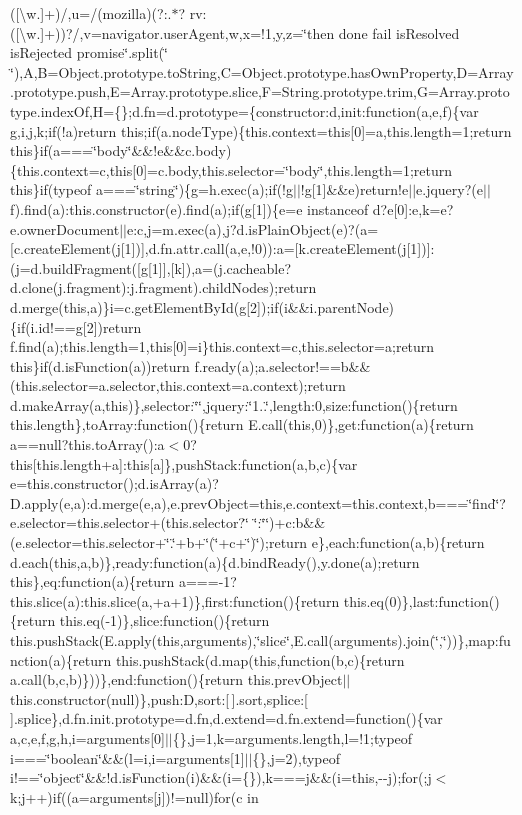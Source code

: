 ([\textbackslash{}w.]+)/,u=/(mozilla)(?\-:.$\ast$? rv\-:([\textbackslash{}w.]+))?/,v=navigator.\-user\-Agent,w,x=!1,y,z=\char`\"{}then done fail is\-Resolved is\-Rejected promise\char`\"{}.\-split(\char`\"{} \char`\"{}),\-A,\-B=\-Object.\-prototype.\-to\-String,\-C=\-Object.\-prototype.\-has\-Own\-Property,\-D=\-Array.\-prototype.\-push,\-E=\-Array.\-prototype.\-slice,\-F=\-String.\-prototype.\-trim,\-G=\-Array.\-prototype.\-index\-Of,\-H=\{\};d.\-fn=d.\-prototype=\{constructor\-:d,init\-:function(a,e,f)\{var g,i,j,k;if(!a)return this;if(a.\-node\-Type)\{this.\-context=this[0]=a,this.\-length=1;return this\}if(a===\char`\"{}body\char`\"{}\&\&!e\&\&c.\-body)\{this.\-context=c,this[0]=c.\-body,this.\-selector=\char`\"{}body\char`\"{},this.\-length=1;return this\}if(typeof a===\char`\"{}string\char`\"{})\{g=h.\-exec(a);if(!g$|$$|$!g[1]\&\&e)return!e$|$$|$e.\-jquery?(e$|$$|$f).\-find(a)\-:this.\-constructor(e).\-find(a);if(g[1])\{e=e instanceof d?e[0]\-:e,k=e?e.\-owner\-Document$|$$|$e\-:c,j=m.\-exec(a),j?d.\-is\-Plain\-Object(e)?(a=[c.\-create\-Element(j[1])],d.\-fn.\-attr.\-call(a,e,!0))\-:a=[k.\-create\-Element(j[1])]\-:(j=d.\-build\-Fragment([g[1]],[k]),a=(j.\-cacheable?d.\-clone(j.\-fragment)\-:j.\-fragment).\-child\-Nodes);return d.\-merge(this,a)\}i=c.\-get\-Element\-By\-Id(g[2]);if(i\&\&i.\-parent\-Node)\{if(i.\-id!==g[2])return f.\-find(a);this.\-length=1,this[0]=i\}this.\-context=c,this.\-selector=a;return this\}if(d.\-is\-Function(a))return f.\-ready(a);a.\-selector!==b\&\&(this.\-selector=a.\-selector,this.\-context=a.\-context);return d.\-make\-Array(a,this)\},selector\-:\char`\"{}\char`\"{},jquery\-:\char`\"{}1..\char`\"{},length\-:0,size\-:function()\{return this.\-length\},to\-Array\-:function()\{return E.\-call(this,0)\},get\-:function(a)\{return a==null?this.\-to\-Array()\-:a$<$0?this[this.\-length+a]\-:this[a]\},push\-Stack\-:function(a,b,c)\{var e=this.\-constructor();d.\-is\-Array(a)?\-D.\-apply(e,a)\-:d.\-merge(e,a),e.\-prev\-Object=this,e.\-context=this.\-context,b===\char`\"{}find\char`\"{}?e.\-selector=this.\-selector+(this.\-selector?\char`\"{} \char`\"{}\-:\char`\"{}\char`\"{})+c\-:b\&\&(e.\-selector=this.\-selector+\char`\"{}.\char`\"{}+b+\char`\"{}(\char`\"{}+c+\char`\"{})\char`\"{});return e\},each\-:function(a,b)\{return d.\-each(this,a,b)\},ready\-:function(a)\{d.\-bind\-Ready(),y.\-done(a);return this\},eq\-:function(a)\{return a===-\/1?this.\-slice(a)\-:this.\-slice(a,+a+1)\},first\-:function()\{return this.\-eq(0)\},last\-:function()\{return this.\-eq(-\/1)\},slice\-:function()\{return this.\-push\-Stack(\-E.\-apply(this,arguments),\char`\"{}slice\char`\"{},\-E.\-call(arguments).\-join(\char`\"{},\char`\"{}))\},map\-:function(a)\{return this.\-push\-Stack(d.\-map(this,function(b,c)\{return a.\-call(b,c,b)\}))\},end\-:function()\{return this.\-prev\-Object$|$$|$this.\-constructor(null)\},push\-:\-D,sort\-:[$\,$].\-sort,splice\-:[$\,$].\-splice\},d.\-fn.\-init.\-prototype=d.\-fn,d.\-extend=d.\-fn.\-extend=function()\{var a,c,e,f,g,h,i=arguments[0]$|$$|$\{\},j=1,k=arguments.\-length,l=!1;typeof i===\char`\"{}boolean\char`\"{}\&\&(l=i,i=arguments[1]$|$$|$\{\},j=2),typeof i!==\char`\"{}object\char`\"{}\&\&!d.\-is\-Function(i)\&\&(i=\{\}),k===j\&\&(i=this,-\/-\/j);for(;j$<$k;j++)if((a=arguments[j])!=null)for(c in 